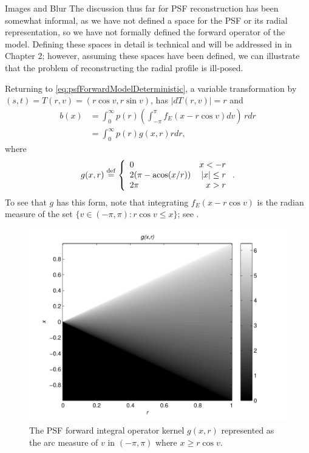 \begin{chapter}{Images and Blur}
  The discussion thus far for PSF reconstruction has been somewhat informal, as we have not defined a space for the PSF or its radial representation, so we have not formally defined the forward operator of the model.
  Defining these spaces in detail is technical and will be addressed in in Chapter 2; however, assuming these spaces have been defined, we can illustrate that the problem of reconstructing the radial profile is ill-posed.

  Returning to \eqref{eq:psfForwardModelDeterministic}, a variable transformation
  by $(s,t) = T(r,v) = (r\cos v,r\sin v)$, has $|dT(r,v)| = r$ and 
  \begin{align}
    b(x) &= \int_0^\infty p(r) \left( \int_{-\pi}^\pi f_E(x - r\cos v)dv \right)\,r dr\nonumber \\
         &= \int_0^\infty p(r) g(x,r) r dr, \label{eq:radialForwardModelDeterministic}
  \end{align}
where
\begin{equation} \label{eq:radialForwardKernel}
  g(x,r) \stackrel{\rm def}{=} \left\{\begin{array}{lr}
    0 & x < - r\\
    2(\pi - \operatorname*{acos}(x/r)) & |x| \le r\\
    2\pi &  x> r
  \end{array}\right..  
\end{equation}
  To see that $g$ has this form, note that integrating $f_E(x-r\cos v)$ is the radian measure of the set $\{v\in(-\pi,\pi): r\cos v \le x\}$; see .  

\begin{figure}
  \begin{center}
  \includegraphics[width=.5\textwidth]{figures/g_function.pdf}
\end{center}
\caption{ The PSF forward integral operator kernel $g(x,r)$ represented as the arc measure of $v$ in $(-\pi,\pi)$ where $x \ge r\cos v$. }\label{fig:radialForwardKernel}
\end{figure}


\end{chapter}
